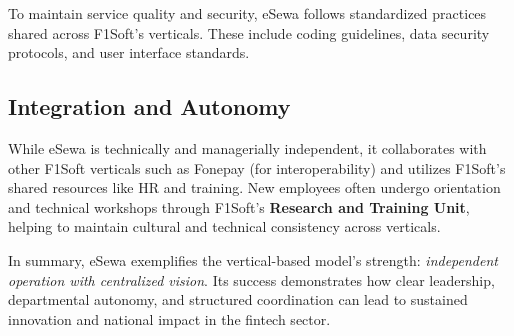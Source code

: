 \documentclass[12pt, a4paper]{report}
\begin{document}
To maintain service quality and security, eSewa follows standardized practices shared across F1Soft’s verticals. These include coding guidelines, data security protocols, and user interface standards.
\vspace{18pt}
\subsection{Integration and Autonomy}
While eSewa is technically and managerially independent, it collaborates with other F1Soft verticals such as Fonepay (for interoperability) and utilizes F1Soft’s shared resources like HR and training. New employees often undergo orientation and technical workshops through F1Soft’s \textbf{Research and Training Unit}, helping to maintain cultural and technical consistency across verticals.

\bigskip

In summary, eSewa exemplifies the vertical-based model’s strength: \textit{independent operation with centralized vision}. Its success demonstrates how clear leadership, departmental autonomy, and structured coordination can lead to sustained innovation and national impact in the fintech sector.
\end{document}
